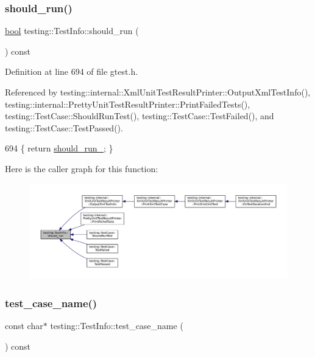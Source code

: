 \subsubsection{\texorpdfstring{should\+\_\+run()}{should\_run()}}
{\footnotesize\ttfamily \hyperlink{classbool}{bool} testing\+::\+Test\+Info\+::should\+\_\+run (\begin{DoxyParamCaption}{ }\end{DoxyParamCaption}) const\hspace{0.3cm}{\ttfamily [inline]}}



Definition at line 694 of file gtest.\+h.



Referenced by testing\+::internal\+::\+Xml\+Unit\+Test\+Result\+Printer\+::\+Output\+Xml\+Test\+Info(), testing\+::internal\+::\+Pretty\+Unit\+Test\+Result\+Printer\+::\+Print\+Failed\+Tests(), testing\+::\+Test\+Case\+::\+Should\+Run\+Test(), testing\+::\+Test\+Case\+::\+Test\+Failed(), and testing\+::\+Test\+Case\+::\+Test\+Passed().


\begin{DoxyCode}
694 \{ \textcolor{keywordflow}{return} \hyperlink{classtesting_1_1TestInfo_a89c3d8fb8b565532c34d3123240fd5cf}{should\_run\_}; \}
\end{DoxyCode}
Here is the caller graph for this function\+:
\nopagebreak
\begin{figure}[H]
\begin{center}
\leavevmode
\includegraphics[width=350pt]{classtesting_1_1TestInfo_a866e33b5bc5ab2a6e5375fc7d3af0f96_icgraph}
\end{center}
\end{figure}
\mbox{\label{classtesting_1_1TestInfo_a036a20710c8c2252889544daba9a8ff9}} 
\subsubsection{\texorpdfstring{test\+\_\+case\+\_\+name()}{test\_case\_name()}}
{\footnotesize\ttfamily const char$\ast$ testing\+::\+Test\+Info\+::test\+\_\+case\+\_\+name (\begin{DoxyParamCaption}{ }\end{DoxyParamCaption}) const\hspace{0.3cm}{\ttfamily [inline]}}



